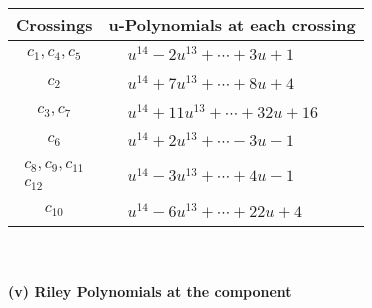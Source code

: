 \documentclass[1p]{elsarticle_modified}
\theoremstyle{definition}
\begin{document}
\begin{tabular}{m{50pt}|m{274pt}}
Crossings & \hspace{64pt}u-Polynomials at each crossing \\
\hline $$\begin{aligned}c_{1},c_{4},c_{5}\end{aligned}$$&$\begin{aligned}
&u^{14}-2 u^{13}+\cdots+3 u+1
\end{aligned}$\\
\hline $$\begin{aligned}c_{2}\end{aligned}$$&$\begin{aligned}
&u^{14}+7 u^{13}+\cdots+8 u+4
\end{aligned}$\\
\hline $$\begin{aligned}c_{3},c_{7}\end{aligned}$$&$\begin{aligned}
&u^{14}+11 u^{13}+\cdots+32 u+16
\end{aligned}$\\
\hline $$\begin{aligned}c_{6}\end{aligned}$$&$\begin{aligned}
&u^{14}+2 u^{13}+\cdots-3 u-1
\end{aligned}$\\
\hline $$\begin{aligned}c_{8},c_{9},c_{11}\\c_{12}\end{aligned}$$&$\begin{aligned}
&u^{14}-3 u^{13}+\cdots+4 u-1
\end{aligned}$\\
\hline $$\begin{aligned}c_{10}\end{aligned}$$&$\begin{aligned}
&u^{14}-6 u^{13}+\cdots+22 u+4
\end{aligned}$\\
\hline
\end{tabular}\\~\\
\newpage\renewcommand{\arraystretch}{1}
\flushleft \textbf{(v) Riley Polynomials at the component}\newline \\
\end{document}
